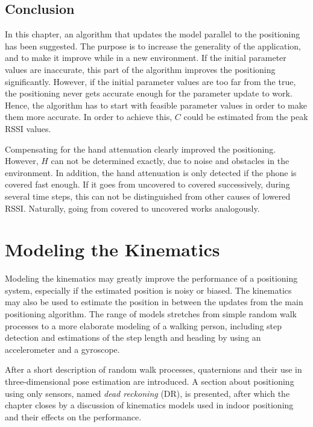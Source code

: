 \documentclass{LTHthesis}
\begin{document}
\section{Conclusion}
In this chapter, an algorithm that updates the model parallel to the positioning has been suggested. The purpose is to increase the generality of the application, and to make it improve while in a new environment. If the initial parameter values are inaccurate, this part of the algorithm improves the positioning significantly. However, if the initial parameter values are too far from the true, the positioning never gets accurate enough for the parameter update to work. Hence, the algorithm has to start with feasible parameter values in order to make them more accurate. In order to achieve this, $C$ could be estimated from the peak RSSI values.


Compensating for the hand attenuation clearly improved the positioning. However, $H$ can not be determined exactly, due to noise and obstacles in the environment. In addition, the hand attenuation is only detected if the phone is covered fast enough. If it goes from uncovered to covered successively, during several time steps, this can not be distinguished from other causes of lowered RSSI. Naturally, going from covered to uncovered works analogously.

\chapter{Modeling the Kinematics} %
\label{chap:kin}
%
Modeling the kinematics may greatly improve the performance of a positioning system, especially if the estimated position is noisy or biased. The kinematics may also be used to estimate the position in between the updates from the main positioning algorithm. The range of models stretches from simple random walk processes to a more elaborate modeling of a walking person, including step detection and estimations of the step length and heading by using an accelerometer and a gyroscope. 

After a short description of random walk processes, quaternions and their use in three-dimensional pose  estimation are introduced. A section about positioning using only sensors, named \emph{dead reckoning} (DR), is presented, after which the chapter closes by a discussion of kinematics models used in indoor positioning and their effects on the performance.   
%
\end{document}
